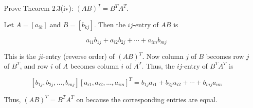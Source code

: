 Prove Theorem 2.3(iv): $(A B)^{T}=B^{T} A^{T}$.

Let $A=\left[a_{i k}\right]$ and $B=\left[b_{k j}\right]$. Then the $i j$-entry of $A B$ is

$$
    a_{i 1} b_{1 j}+a_{i 2} b_{2 j}+\cdots+a_{i m} b_{m j}
$$

This is the $j i$-entry (reverse order) of $(A B)^{T}$. Now column $j$ of $B$ becomes row $j$ of $B^{T}$, and row $i$ of $A$ becomes column $i$ of $A^{T}$. Thus, the $i j$-entry of $B^{T} A^{T}$ is

$$
    \left[b_{1 j}, b_{2 j}, \ldots, b_{m j}\right]\left[a_{i 1}, a_{i 2}, \ldots, a_{i m}\right]^{T}=b_{1 j} a_{i 1}+b_{2 j} a_{i 2}+\cdots+b_{m j} a_{i m}
$$

Thus, $(A B)^{T}=B^{T} A^{T}$ on because the corresponding entries are equal.